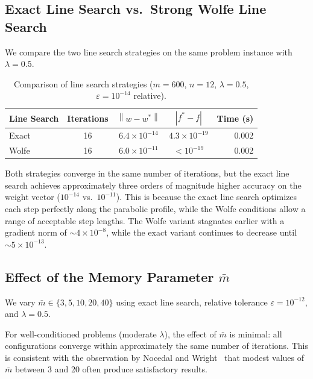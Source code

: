 \documentclass[11pt,a4paper]{article}
\newcommand{\norm}[1]{\left\|#1\right\|}
\begin{document}
\subsection{Exact Line Search vs.\ Strong Wolfe Line Search}
\label{sec:exact_vs_wolfe}

We compare the two line search strategies on the same problem instance with $\lambda = 0.5$.

\begin{table}[h]
\centering
\caption{Comparison of line search strategies ($m=600$, $n=12$, $\lambda=0.5$, $\varepsilon=10^{-14}$ relative).}
\label{tab:ls_comparison}
\begin{tabular}{lcccr}
    \toprule
    \textbf{Line Search} & \textbf{Iterations} & $\norm{w - w^*}$ & $|f^* - f|$ & \textbf{Time (s)} \\
    \midrule
    Exact   & 16 & $6.4 \times 10^{-14}$ & $4.3 \times 10^{-19}$ & 0.002 \\
    Wolfe   & 16 & $6.0 \times 10^{-11}$ & $< 10^{-19}$ & 0.002 \\
    \bottomrule
\end{tabular}
\end{table}

Both strategies converge in the same number of iterations, but the exact line search 
achieves approximately three orders of magnitude higher accuracy on the weight vector 
($10^{-14}$ vs.\ $10^{-11}$). This is because the exact line search optimizes each step 
perfectly along the parabolic profile, while the Wolfe conditions allow a range of 
acceptable step lengths. The Wolfe variant stagnates earlier with a gradient norm 
of $\sim\!4 \times 10^{-8}$, while the exact variant continues to decrease until 
$\sim\!5 \times 10^{-13}$.



\subsection{Effect of the Memory Parameter \texorpdfstring{$\bar{m}$}{mbar}}
\label{sec:memory_effect}

We vary $\bar{m} \in \{3, 5, 10, 20, 40\}$ using exact line search, relative tolerance 
$\varepsilon = 10^{-12}$, and $\lambda = 0.5$.

For well-conditioned problems (moderate $\lambda$), the effect of $\bar{m}$ is minimal: 
all configurations converge within approximately the same number of iterations. 
This is consistent with the observation by Nocedal and Wright~\cite[Section~9.1]{nocedal2006numerical} 
that modest values of $\bar{m}$ between 3 and 20 often produce satisfactory results.
\end{document}
